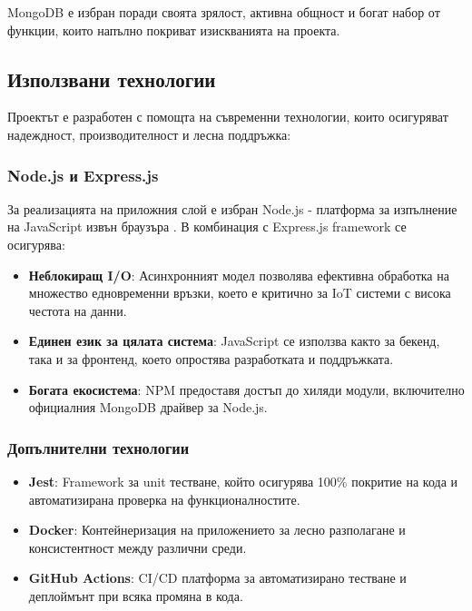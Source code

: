 MongoDB е избран поради своята зрялост, активна общност и богат набор от функции, които напълно покриват изискванията на проекта.

\subsection{Използвани технологии}

Проектът е разработен с помощта на съвременни технологии, които осигуряват надеждност, производителност и лесна поддръжка:

\subsubsection{Node.js и Express.js}

За реализацията на приложния слой е избран Node.js - платформа за изпълнение на JavaScript извън браузъра \cite{nodejs_docs}. В комбинация с Express.js framework се осигурява:

\begin{itemize}
    \item \textbf{Неблокиращ I/O}: Асинхронният модел позволява ефективна обработка на множество едновременни връзки, което е критично за IoT системи с висока честота на данни.

    \item \textbf{Единен език за цялата система}: JavaScript се използва както за бекенд, така и за фронтенд, което опростява разработката и поддръжката.

    \item \textbf{Богата екосистема}: NPM предоставя достъп до хиляди модули, включително официалния MongoDB драйвер за Node.js.
\end{itemize}

\subsubsection{Допълнителни технологии}

\begin{itemize}
    \item \textbf{Jest}: Framework за unit тестване, който осигурява 100\% покритие на кода и автоматизирана проверка на функционалностите.

    \item \textbf{Docker}: Контейнеризация на приложението за лесно разполагане и консистентност между различни среди.

    \item \textbf{GitHub Actions}: CI/CD платформа за автоматизирано тестване и деплоймънт при всяка промяна в кода.
\end{itemize}

